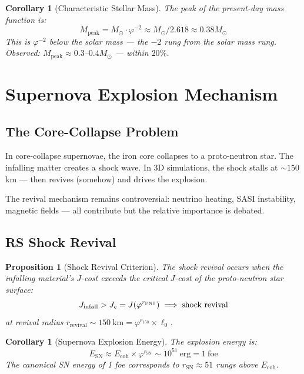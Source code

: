 \documentclass[12pt,a4paper]{article}
\newtheorem{corollary}[theorem]{Corollary}
\newtheorem{proposition}[theorem]{Proposition}
\theoremstyle{definition}
\theoremstyle{remark}
\begin{document}
\begin{corollary}[Characteristic Stellar Mass]
The peak of the present-day mass function is:
\begin{equation}
M_\mathrm{peak} = M_\odot \cdot \varphi^{-2} \approx M_\odot / 2.618 \approx 0.38 M_\odot
\end{equation}
This is $\varphi^{-2}$ below the solar mass — the $-2$ rung from the solar mass rung.
Observed: $M_\mathrm{peak} \approx 0.3$--$0.4 M_\odot$ — within $20\%$.
\end{corollary}

\section{Supernova Explosion Mechanism}

\subsection{The Core-Collapse Problem}

In core-collapse supernovae, the iron core collapses to a proto-neutron star.
The infalling matter creates a shock wave. In 3D simulations, the shock 
stalls at $\sim 150$ km — then revives (somehow) and drives the explosion.

The revival mechanism remains controversial: neutrino heating, SASI instability, 
magnetic fields — all contribute but the relative importance is debated.

\subsection{RS Shock Revival}

\begin{proposition}[Shock Revival Criterion]
\label{prop:snrevival}
The shock revival occurs when the infalling material's $J$-cost exceeds 
the critical $J$-cost of the proto-neutron star surface:
\begin{equation}
J_\mathrm{infall} > J_c = J(\varphi^{r_\mathrm{PNS}}) \implies \textup{shock revival}
\end{equation}
at revival radius $r_\mathrm{revival} \sim 150~\mathrm{km} = \varphi^{r_{150}} \times \ell_0$.
\end{proposition}

\begin{corollary}[Supernova Explosion Energy]
The explosion energy is:
\begin{equation}
E_\mathrm{SN} \approx E_\mathrm{coh} \times \varphi^{r_\mathrm{SN}} \sim 10^{51}~\mathrm{erg} = 1~\mathrm{foe}
\end{equation}
The canonical SN energy of 1 foe corresponds to $r_\mathrm{SN} \approx 51$ rungs above $E_\mathrm{coh}$.
\end{corollary}
\end{document}
